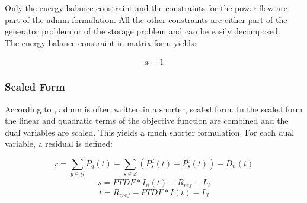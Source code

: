 Only the energy balance constraint and the constraints for the power flow are part of the \gls{admm} formulation. All the other constraints are either part of the generator problem or of the storage problem and can be easily decomposed. \\

The energy balance constraint in matrix form yields: 

\begin{subequations}
	\begin{align}
		a = 1
	\end{align}
\end{subequations}


\subsubsection{Scaled Form}

According to \citet{Boyd-2010-DistributedOptimizationStatistical}, \gls{admm} is often written in a shorter, scaled form. In the scaled form the linear and quadratic terms of the objective function are combined and the dual variables are scaled. This yields a much shorter formulation. For each dual variable, a residual is defined:

\begin{equation}
	r = \sum_{g\in\mathcal{G}}P_g(t) + \sum_{s\in\mathcal{S}}(P_s^d(t)-P_s^c(t))-D_n(t)
\end{equation} 
\begin{equation}
	s = PTDF * I_n(t) + R_{ref} - \overline{L_l}
\end{equation} 
\begin{equation}
	t = R_{cref} - PTDF * I(t) - \overline{L_l}
\end{equation}

